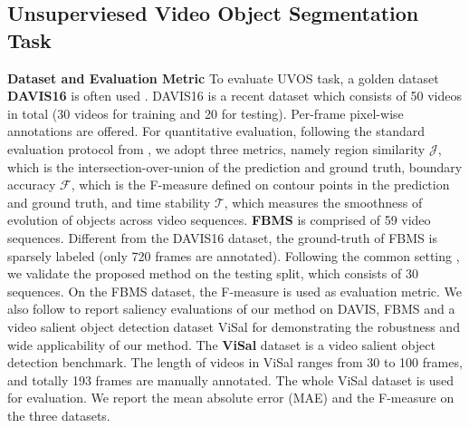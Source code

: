 \documentclass[runningheads]{llncs}
\begin{document}
\subsection{Unsuperviesed Video Object Segmentation Task}\label{exp_uvos}
\textbf{Dataset and Evaluation Metric} To evaluate UVOS task, a golden dataset \textbf{DAVIS16} is often used  \cite{vos_cosnet,vos_agnn,vos_ags,vos_lsmo,vos_pdb}. DAVIS16 is a recent dataset which consists of 50 videos in total (30 videos for training and 20 for testing). Per-frame pixel-wise annotations are offered. For quantitative evaluation, following the standard evaluation protocol from \cite{davis_16}, we adopt three metrics, namely region similarity $\mathcal{J}$, which is the intersection-over-union of the prediction and ground truth, boundary accuracy $\mathcal{F}$, which is the F-measure defined on contour points in the prediction and ground truth, and time stability $\mathcal{T}$, which measures the smoothness of evolution of objects across video sequences. \textbf{FBMS} \cite{fbms} is comprised of 59 video sequences. Different from the DAVIS16 dataset, the ground-truth of FBMS is sparsely labeled (only 720 frames are annotated). Following the common setting \cite{vos_pdb,vos_andiff,motadapt}, we validate the proposed method on the testing split, which consists of 30 sequences. On the FBMS dataset, the F-measure is used as evaluation metric.  We also follow  \cite{vos_pdb,vos_andiff} to report saliency evaluations of our method on DAVIS, FBMS and a video salient object detection dataset ViSal \cite{video_gafl} for demonstrating the robustness and wide applicability of our method.  The \textbf{ViSal} \cite{video_gafl} dataset is a video salient object detection benchmark. The length of videos in ViSal ranges from 30 to 100 frames, and totally 193 frames are manually annotated. The whole ViSal dataset is used for evaluation. We report the mean absolute error (MAE) and the F-measure on the three datasets. \\
\end{document}
